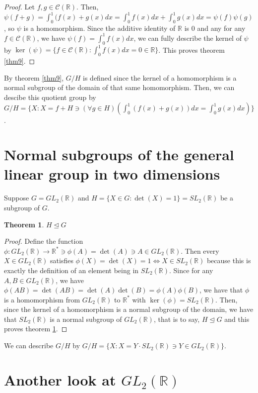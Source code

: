 \documentclass[12pt]{article}
\newcommand{\reals}{\mathbb{R}}
\newcommand{\gltwo}{GL_2(\reals)}
\newcommand{\sltwo}{SL_2(\reals)}
\newcommand{\creals}{\mathcal{C}(\reals)}
\newtheorem{thm}{Theorem}
\begin{document}
\begin{proof}
	Let $f,g \in \creals$.
	Then, $\psi(f + g) = \int_0^1 (f(x) + g(x)dx = \int_0^1 f(x)dx + \int_0^1 g(x)dx = \psi(f) \psi(g)$,
	so $\psi$ is a homomorphism.
	Since the additive identity of $\reals$ is $0$ and any for any $f \in \creals$,
	we have $\psi(f) = \int_0^1 f(x)dx$, we can fully describe the kernel of $\psi$
	by $\ker(\psi) = \{ f \in \creals : \int_0^1 f(x)dx = 0 \in \reals \}$.
	This proves theorem \ref{thm9}.
\end{proof}

By theorem \ref{thm9},
$G/H$ is defined since the kernel of a homomorphism
is a normal subgroup of the domain of that same homomorphism.
Then, we can descibe this quotient group
by $G/H = \{X: X = f + H \ni (\forall g \in H)(\int_0^1 (f(x) + g(x))dx = \int_0^1 g(x)dx) \}$.

\section{Normal subgroups of the general linear group in two dimensions}

Suppose $G = \gltwo$ and $H = \{ X \in G: \det(X) = 1 \} = \sltwo$ be a subgroup of $G$.

\begin{thm} \label{thm10}
	$H \trianglelefteq G$
\end{thm}

\begin{proof}
	Define the function $\phi: \gltwo \to \reals^* \ni \phi(A) = \det(A) \ni A \in \gltwo$.
	Then every $X \in \gltwo$ satisfies $\phi(X) = \det(X) = 1 \iff X \in \sltwo$
	because this is exactly the definition of an element being in $\sltwo$.
	Since for any $A,B \in \gltwo$, we have $\phi(AB) = \det(AB) = \det(A)\det(B) = \phi(A)\phi(B)$,
	we have that $\phi$ is a homomorphism from $\gltwo$ to $\reals^*$
	with $\ker(\phi) = \sltwo$.
	Then, since the kernel of a homomorphism is a normal subgroup of the domain,
	we have that $\sltwo$ is a normal subgroup of $\gltwo$,
	that is to say, $H \trianglelefteq G$ and this proves theorem \ref{thm10}.
\end{proof}

We can describe $G/H$
by $G/H =  \{X:X=Y\cdot\sltwo\ni Y\in \gltwo\}$.

\section{Another look at $\gltwo$}
\end{document}
